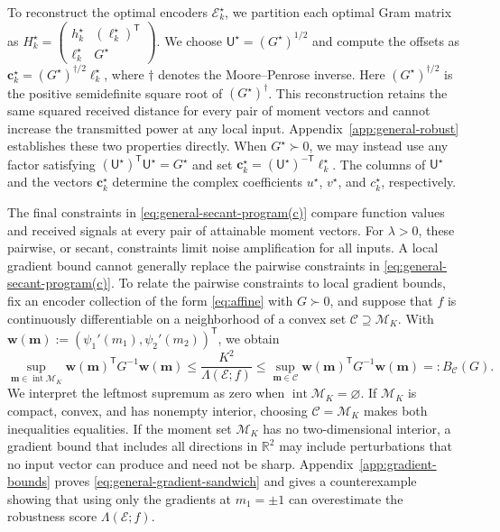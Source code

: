 \documentclass[journal,12pt,onecolumn,draftclsnofoot]{IEEEtran}
\newcommand{\enc}{\mathscr{E}}\newcommand{\dec}{\mathscr{D}}\newcommand{\R}{\mathbb R}\newcommand{\C}{\mathbb C}
\newcommand{\T}{\mathsf T}\newcommand{\suc}{\succeq}
\begin{document}
To reconstruct the optimal encoders $\enc_k^\star$, we partition each optimal Gram matrix as
$H_k^\star=\left(
\begin{smallmatrix}
h_k^\star & (\boldsymbol{\ell}_k^\star)^\mathsf{T} \\
\boldsymbol{\ell}_k^\star & G^\star
\end{smallmatrix}
\right)
$. 
We choose $\mathsf{U}^\star=(G^\star)^{1/2}$ and compute the offsets as
$\boldsymbol{c}_k^\star=(G^\star)^{\dagger/2}\boldsymbol{\ell}_k^\star$,
where $\dagger$ denotes the Moore--Penrose inverse. Here $(G^\star)^{\dagger/2}$ is the positive semidefinite square root of $(G^\star)^\dagger$. This reconstruction retains the same squared received distance for every pair of moment vectors and cannot increase the transmitted power at any local input. Appendix~\ref{app:general-robust} establishes these two properties directly. When
$G^\star\succ0$, we may instead use any factor satisfying
$(\mathsf{U}^\star)^\mathsf{T}\mathsf{U}^\star=G^\star$ and set
$\boldsymbol{c}_k^\star=(\mathsf{U}^\star)^{-\mathsf{T}}
\boldsymbol{\ell}_k^\star$. The columns of $\mathsf{U}^\star$ and
the vectors $\boldsymbol{c}_k^\star$ determine the complex coefficients
$u^\star$, $v^\star$, and $c_k^\star$, respectively.


The final constraints in \eqref{eq:general-secant-program(c)} compare function values and received signals at every pair of attainable moment vectors. For $\lambda>0$, these pairwise, or secant, constraints limit noise amplification for all inputs. A local gradient bound cannot generally replace the pairwise constraints in \eqref{eq:general-secant-program(c)}. To relate the pairwise constraints to local gradient bounds, fix an encoder collection of the form \eqref{eq:affine} with $G\succ0$, and suppose that $f$ is continuously differentiable on a neighborhood of a convex set $\mathcal C\supseteq\mathcal M_K$. With
$\boldsymbol w(\boldsymbol m):=
(\psi_1'(m_1),\psi_2'(m_2))^\T$, we obtain
\begin{equation}
\sup_{\boldsymbol m\in\operatorname{int}\mathcal M_K}
\boldsymbol w(\boldsymbol m)^\mathsf T G^{-1}\boldsymbol w(\boldsymbol m)
\le \frac{K^2}{\Lambda(\enc;f)}\le \sup_{\boldsymbol m\in\mathcal C}
\boldsymbol w(\boldsymbol m)^\mathsf T G^{-1}\boldsymbol w(\boldsymbol m) =:B_{\mathcal C}(G). 
\label{eq:general-gradient-sandwich}
\end{equation}
We interpret the leftmost supremum as zero when
$\operatorname{int}\mathcal M_K=\varnothing$. If $\mathcal M_K$ is
compact, convex, and has nonempty interior, choosing
$\mathcal C=\mathcal M_K$ makes both inequalities equalities.
If the moment set $\mathcal M_K$ has no two-dimensional interior, a gradient bound that includes all directions in $\R^2$ may include perturbations that no input vector can produce and need not be sharp. Appendix~\ref{app:gradient-bounds} proves
\eqref{eq:general-gradient-sandwich} and gives a counterexample showing that using only the gradients at $m_1=\pm1$ can overestimate the robustness score $\Lambda(\enc;f)$.
\end{document}
